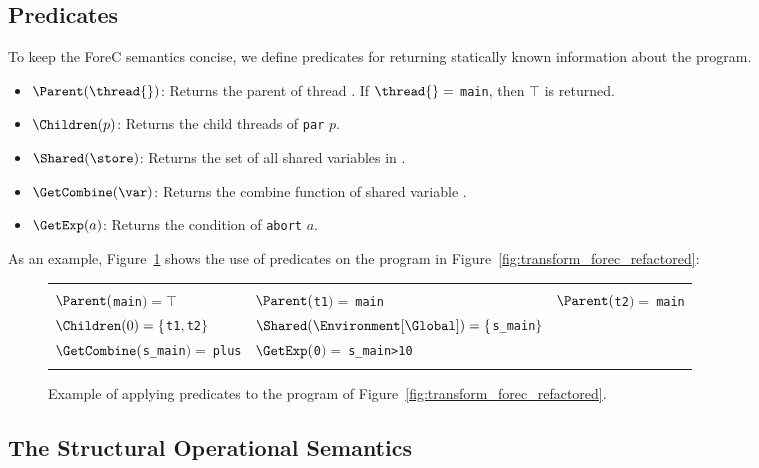 
\subsection{Predicates}
To keep the ForeC semantics concise, we define predicates for returning 
statically known information about the program. 
\begin{itemize}
	\item $\Parent(\thread{})$:
		Returns the parent of thread \thread{}.
		If $\thread{} =$ \verb$main$, then $\top$ is returned.
	\item $\Children(p)$:
		Returns the child threads of \verb$par$ $p$.
	\item $\Shared(\store)$:
		Returns the set of all shared variables in \store{}.
	\item $\GetCombine(\var)$:
		Returns the combine function of shared variable \var{}.
	\item $\GetExp(a)$:
		Returns the condition \expression{} of \verb$abort$ $a$.
\end{itemize}
As an example, Figure~\ref{fig:forec_predicates} shows the use of predicates on
the program in Figure~\ref{fig:transform_forec_refactored}:
\begin{figure}[ht]
	\centering
	\begin{tabular}{|l l l|}
		\hline
														&															&											\\
		$\Parent($\verb$main$$) = \top$					& $\Parent($\verb$t1$$) =~$\verb$main$						& $\Parent($\verb$t2$$) =~$\verb$main$		\\
		$\Children(0) = \{$\verb$t1$$,$\verb$t2$$\}$	& $\Shared(\Environment[\Global]) = \{$\verb$s_main$$\}$	&											\\
		$\GetCombine($\verb$s_main$$) =~$\verb$plus$	& $\GetExp($\verb$0$$) =~$\verb$s_main>10$					&											\\
														&															&											\\
		\hline
	\end{tabular}
	
	\caption{Example of applying predicates to the program of Figure~\ref{fig:transform_forec_refactored}.}
	\label{fig:forec_predicates}
\end{figure}



\subsection{The Structural Operational Semantics}

